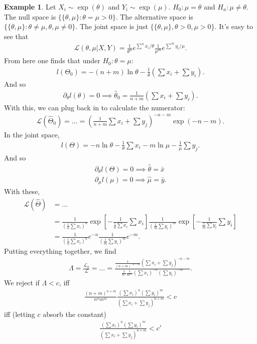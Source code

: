 \documentclass{book}
\theoremstyle{definition}
\newtheorem{exmp}{Example}[section]
\newcommand{\p}{\partial}
\newcommand{\lag}{\mathcal{L}}
\newcommand{\f}[2]{\frac{#1}{#2}}
\newcommand{\lp}{\left(}
\newcommand{\rp}{\right)}
\newcommand{\lb}{\left[}
\newcommand{\rb}{\right]}
\begin{document}
\begin{exmp}
	Let $X_i \sim \exp (\theta)$ and $Y_i \sim \exp(\mu)$. $H_0 : \mu = \theta$ and $H_a : \mu \neq \theta$. The null space is $\{ \{ \theta,\mu\}: \theta = \mu > 0 \}$. The alternative space is $\{ \{ \theta,\mu \}: \theta \neq \mu, \theta,\mu \neq 0 \}$. The joint space is just $\{ \{ \theta,\mu \}, \theta >0, \mu > 0 \}$. It's easy to see that
	\begin{align}
	\lag(\theta,\mu \vert X,Y) = \f{1}{\theta^n}e^{\sum^n x_i/\theta} \f{1}{\mu^m}e^{\sum^m y_i/\mu} .
	\end{align}
	From here one finds that under $H_0: \theta = \mu$:
	\begin{align}
	l(\Theta_0) = -(n+m) \ln\theta-\f{1}{\theta}\lp \sum x_i + \sum y_i \rp.
	\end{align}
	And so
	\begin{align}
	\p_\theta l(\theta) = 0 \implies \hat\theta_0 = \f{1}{n+m} \lp \sum x_i + \sum y_i \rp.
	\end{align}
	With this, we can plug back in to calculate the numerator:
	\begin{align}
	\lag(\hat\Theta_0) = \dots = \lp\f{1}{n+m} \sum x_i + \sum y_j \rp^{-n-m} \exp(-n-m).
	\end{align}
	In the joint space, 
	\begin{align}
	l(\Theta) = -n \ln \theta - \f{1}{\theta}\sum x_i - m \ln \mu - \f{1}{\mu}\sum y_j.
	\end{align}
	And so
	\begin{align}
	\p_\theta l(\Theta) = 0 \implies \hat\theta = \bar{x}\\
	\p_\mu l(\mu) = 0 \implies \hat\mu =  \bar{y}.
	\end{align}
	With these,
	\begin{align}
	\lag(\hat\Theta) &= \dots\\
	&= \f{1}{\lp \f{1}{n}\sum x_i \rp^n} \exp \lb -\f{1}{\f{1}{n}\sum x_i} \sum x_i\rb  
	\f{1}{\lp \f{1}{m}\sum y_i \rp^m} \exp \lb -\f{1}{\f{1}{m}\sum y_i} \sum y_i\rb\\
	&=\f{1}{\lp \f{1}{n}\sum x_i \rp^n} e^{-n} \f{1}{\lp \f{1}{m}\sum y_i \rp^m} e^{-m}.
	\end{align}
	Putting everything together, we find
	\begin{align}
	\Lambda = \f{\lag_0}{\lag} = \dots = \f{\f{1}{(n+m)^{-n-m}} \lp \sum x_i + \sum y_j \rp^{-n-m}   }{\f{1}{n^n} \f{1}{m^m} \lp \sum x_i \rp^{-n} \lp \sum y_i \rp^{-m}}.
	\end{align}
	We reject if $\Lambda < c$, iff
	\begin{align}
	\f{(n+m)^{n+m}}{n^n m^m} \f{\lp \sum x_i \rp^{n} \lp \sum y_i \rp^{m}}{\lp \sum x_i + \sum y_j \rp^{n+m} } < c
	\end{align}
	iff (letting $c$ absorb the constant)
	\begin{align}
	\f{\lp \sum x_i \rp^{n} \lp \sum y_i \rp^{m}}{\lp \sum x_i + \sum y_j \rp^{n+m} } < c'
	\end{align}
	

\end{exmp}
\end{document}

